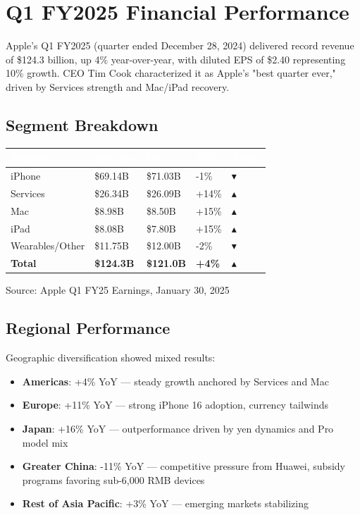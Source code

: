 \documentclass[11pt,a4paper]{article}
\newcommand{\kpiup}{\textcolor{msgreen}{$\blacktriangle$}}
\newcommand{\kpidown}{\textcolor{msred}{$\blacktriangledown$}}
\begin{document}
\section{Q1 FY2025 Financial Performance}

Apple's Q1 FY2025 (quarter ended December 28, 2024) delivered record revenue of \$124.3 billion, up 4\% year-over-year, with diluted EPS of \$2.40 representing 10\% growth. CEO Tim Cook characterized it as Apple's "best quarter ever," driven by Services strength and Mac/iPad recovery.

\subsection{Segment Breakdown}

\begin{center}
\begin{tabular}{L{3.5cm}R{2.5cm}R{2.5cm}R{2cm}C{1.5cm}}
\toprule
{}
\textcolor{white}{\textbf{Segment}} & \textcolor{white}{\textbf{Revenue}} & \textcolor{white}{\textbf{Est.}} & \textcolor{white}{\textbf{YoY}} & \textcolor{white}{\textbf{Trend}} \\
\midrule
iPhone & \$69.14B & \$71.03B & -1\% & \kpidown \\
Services & \$26.34B & \$26.09B & +14\% & \kpiup \\
Mac & \$8.98B & \$8.50B & +15\% & \kpiup \\
iPad & \$8.08B & \$7.80B & +15\% & \kpiup \\
Wearables/Other & \$11.75B & \$12.00B & -2\% & \kpidown \\
\midrule
\textbf{Total} & \textbf{\$124.3B} & \textbf{\$121.0B} & \textbf{+4\%} & \kpiup \\
\bottomrule
\end{tabular}
\end{center}

\vspace{6pt}
\textcolor{msgray}{\scriptsize Source: Apple Q1 FY25 Earnings, January 30, 2025}

\subsection{Regional Performance}

Geographic diversification showed mixed results:

\begin{itemize}
    \item \textbf{Americas}: +4\% YoY --- steady growth anchored by Services and Mac
    \item \textbf{Europe}: +11\% YoY --- strong iPhone 16 adoption, currency tailwinds
    \item \textbf{Japan}: +16\% YoY --- outperformance driven by yen dynamics and Pro model mix
    \item \textbf{Greater China}: -11\% YoY --- competitive pressure from Huawei, subsidy programs favoring sub-6,000 RMB devices
    \item \textbf{Rest of Asia Pacific}: +3\% YoY --- emerging markets stabilizing
\end{itemize}
\end{document}

